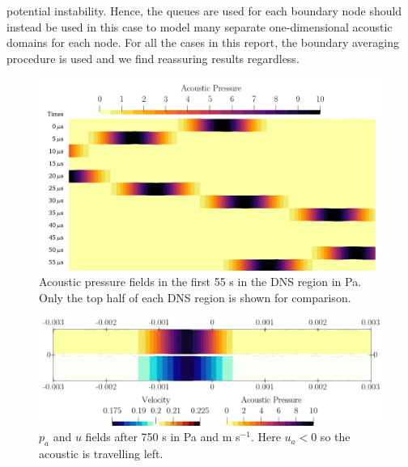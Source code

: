 potential instability. Hence, the queues are used for each boundary node should instead be used in this case to model many separate one-dimensional acoustic domains for each node. For all the cases in this report, the boundary averaging procedure is used and we find reassuring results regardless.

\begin{figure}[t]
\centering
\includegraphics[scale=0.36]{assets/graphs/AC_BUMP_first_bounces_comp.png}
\caption{Acoustic pressure fields in the first 55 {\textmu}s in the DNS region in Pa. Only the top half of each DNS region is shown for comparison.}
\label{fig:ac-bump-dns}
\end{figure}

\begin{figure}[t]
\centering
\includegraphics[scale=0.36]{assets/graphs/AC_BUMP_ndt=150e-4_comp.png}
\caption{$p_a$ and $u$ fields after 750 {\textmu}s in Pa and m s$^{-1}$. Here $u_a < 0$ so the acoustic is travelling left.}
\label{fig:ac-bump-dns-late}
\end{figure}


